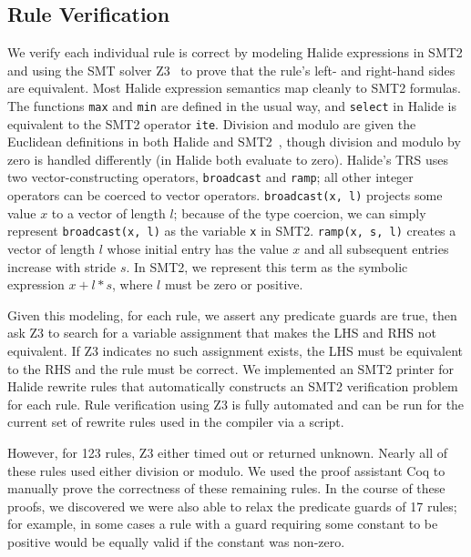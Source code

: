 \documentclass[acmsmall]{acmart}\settopmatter{}
\newcommand{\hmax}[0]{\texttt{max}}
\newcommand{\hmin}[0]{\texttt{min}}
\newcommand{\hsel}[0]{\texttt{select}}
\newcommand{\NumPredicatesRelaxed}{{\color{black} 17}\xspace}
\begin{document}
\subsection{Rule Verification}
\label{sec:verification}
We verify each individual rule is correct by modeling Halide
expressions in SMT2 and using the SMT solver Z3~\cite{de2008z3} to
prove that the rule's left- and right-hand sides are equivalent. Most Halide expression
semantics map cleanly to SMT2 formulas. The functions \hmax{} and
\hmin{} are defined in the usual way, and \hsel{} in
Halide is equivalent to the SMT2 operator \texttt{ite}. Division and
modulo are given the Euclidean definitions in both Halide and
SMT2~\cite{boute1992euclidean}, though division and modulo by zero is handled
differently (in Halide both evaluate to zero).
Halide's TRS uses two vector-constructing operators, \texttt{broadcast} and \texttt{ramp}; all
other integer operators can be coerced to vector operators. 
\texttt{broadcast(x, l)} projects some value $x$ to a vector of length $l$; because of
the type coercion, we can simply represent \texttt{broadcast(x, l)} as the variable
\texttt{x} in SMT2. \texttt{ramp(x, s, l)} creates a vector of length $l$
whose initial entry has the value $x$ and all subsequent entries increase with
stride $s$. In SMT2, we represent this term as the symbolic expression $x + l *
s$, where $l$ must be zero or positive.

Given this modeling, for each rule, we assert any predicate guards are true, then
ask Z3 to search for a variable assignment that makes the LHS and RHS not
equivalent.  If Z3 indicates no such assignment exists, the LHS must be equivalent to
the RHS and the rule must be correct. We implemented an SMT2 printer for 
Halide rewrite rules that automatically constructs an SMT2 verification problem for each rule.
Rule verification using Z3 is fully automated
and can be run for the current set of rewrite rules used in the compiler via a script.

However, for 123
rules, Z3 either timed out or returned unknown. Nearly all of these rules used
either division or modulo. We used the proof assistant Coq to manually prove the
correctness of these remaining rules. In the course of these proofs, we
discovered we were also able to relax the predicate guards of \NumPredicatesRelaxed
rules; for example, in some cases a rule
with a guard requiring some constant to be positive would be equally valid
if the constant was non-zero.
\end{document}
